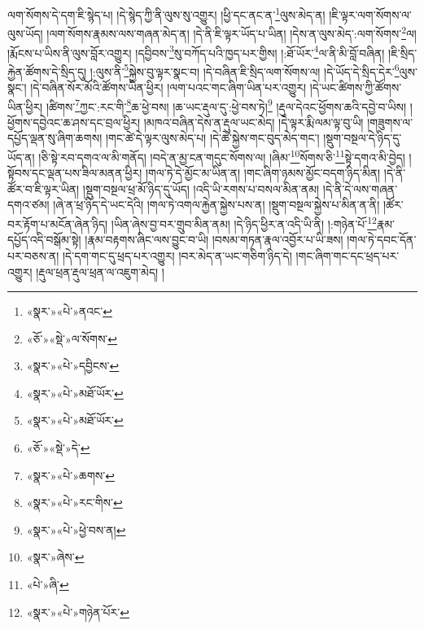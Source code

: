 ལག་སོགས་དེ་དག་ཇི་སྙེད་པ། །དེ་སྙེད་ཀྱི་ནི་ལུས་སུ་འགྱུར། །ཕྱི་དང་ནང་ན་\footnote{«སྣར་»«པེ་»ནའང་}ལུས་མེད་ན། །ཇི་ལྟར་ལག་སོགས་ལ་ལུས་ཡོད། །ལག་སོགས་རྣམས་ལས་གཞན་མེད་ན། །དེ་ནི་ཇི་ལྟར་ཡོད་པ་ཡིན། །དེས་ན་ལུས་མེད་:ལག་སོགས་\footnote{«ཅོ་»«སྡེ་»ལ་སོགས་}ལ། །རྨོངས་པ་ཡིས་ནི་ལུས་བློར་འགྱུར། །དབྱིབས་\footnote{«སྣར་»«པེ་»དབྱིངས་}སུ་བཀོད་པའི་ཁྱད་པར་གྱིས། །:ཐོ་ཡོར་\footnote{«སྣར་»«པེ་»མཐོ་ཡོར་}ལ་ནི་མི་བློ་བཞིན། །ཇི་སྲིད་རྐྱེན་ཚོགས་དེ་སྲིད་དུ། །:ལུས་ནི་\footnote{«སྣར་»«པེ་»མཐོ་ཡོར་}སྐྱེས་བུ་ལྟར་སྣང་བ། །དེ་བཞིན་ཇི་སྲིད་ལག་སོགས་ལ། །དེ་ཡོད་དེ་སྲིད་དེར་\footnote{«ཅོ་»«སྡེ་»དེ་}ལུས་སྣང་། །དེ་བཞིན་སོར་མོའི་ཚོགས་ཡིན་ཕྱིར། །ལག་པའང་གང་ཞིག་ཡིན་པར་འགྱུར། །དེ་ཡང་ཚིགས་ཀྱི་ཚོགས་ཡིན་ཕྱིར། །ཚིགས་\footnote{«སྣར་»«པེ་»ཆགས་}ཀྱང་:རང་གི་\footnote{«སྣར་»«པེ་»རང་གིས་}ཆ་ཕྱེ་བས། །ཆ་ཡང་རྡུལ་དུ་:ཕྱེ་བས་ཏེ།\footnote{«སྣར་»«པེ་»ཕྱེ་བས་ན།} །རྡུལ་དེའང་ཕྱོགས་ཆའི་དབྱེ་བ་ཡིས། །ཕྱོགས་དབྱེའང་ཆ་ཤས་དང་བྲལ་ཕྱིར། །མཁའ་བཞིན་དེས་ན་རྡུལ་ཡང་མེད། །དེ་ལྟར་རྨི་ལམ་ལྟ་བུ་ཡི། །གཟུགས་ལ་དཔྱོད་ལྡན་སུ་ཞིག་ཆགས། །གང་ཚེ་དེ་ལྟར་ལུས་མེད་པ། །དེ་ཚེ་སྐྱེས་གང་བུད་མེད་གང་། །སྡུག་བསྔལ་དེ་ཉིད་དུ་ཡོད་ན། །ཅི་སྟེ་རབ་དགའ་ལ་མི་གནོད། །བདེ་ན་མྱ་ངན་གདུང་སོགས་ལ། །ཞིམ་\footnote{«སྣར་»ཞེས་}སོགས་ཅི་\footnote{«པེ་»ཞི་}སྟེ་དགའ་མི་བྱེད། །སྟོབས་དང་ལྡན་པས་ཟིལ་མནན་ཕྱིར། །གལ་ཏེ་དེ་མྱོང་མ་ཡིན་ན། །གང་ཞིག་ཉམས་མྱོང་བདག་ཉིད་མིན། །དེ་ནི་ཚོར་བ་ཇི་ལྟར་ཡིན། །སྡུག་བསྔལ་ཕྲ་མོ་ཉིད་དུ་ཡོད། །འདི་ཡི་རགས་པ་བསལ་མིན་ནམ། །དེ་ནི་དེ་ལས་གཞན་དགའ་ཙམ། །ཞེ་ན་ཕྲ་ཉིད་དེ་ཡང་དེའི། །གལ་ཏེ་འགལ་རྐྱེན་སྐྱེས་པས་ན། །སྡུག་བསྔལ་སྐྱེས་པ་མིན་ན་ནི། །ཚོར་བར་རྟོག་པ་མངོན་ཞེན་ཉིད། །ཡིན་ཞེས་བྱ་བར་གྲུབ་མིན་ནམ། །དེ་ཉིད་ཕྱིར་ན་འདི་ཡི་ནི། །:གཉེན་པོ་\footnote{«སྣར་»«པེ་»གཉེན་པོར་}རྣམ་དཔྱོད་འདི་བསྒོམ་སྟེ། །རྣམ་བརྟགས་ཞིང་ལས་བྱུང་བ་ཡི། །བསམ་གཏན་རྣལ་འབྱོར་པ་ཡི་ཟས། །གལ་ཏེ་དབང་དོན་པར་བཅས་ན། །དེ་དག་གང་དུ་ཕྲད་པར་འགྱུར། །བར་མེད་ན་ཡང་གཅིག་ཉིད་དེ། །གང་ཞིག་གང་དང་ཕྲད་པར་འགྱུར། །རྡུལ་ཕྲན་རྡུལ་ཕྲན་ལ་འཇུག་མེད། །
